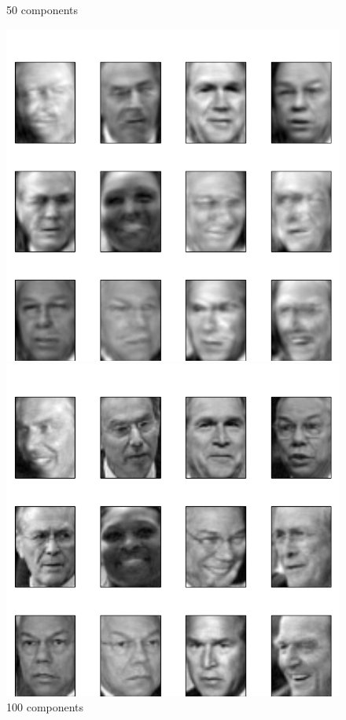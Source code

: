 \documentclass{article}
\begin{document}
\begin{enumerate}
\begin{figure}[!htb]
	  \caption{50 components}
	\endminipage\hfill
	\end{figure}
	\begin{figure}[!htb]
	  \includegraphics[width=\linewidth]{../images/reconstructed100.png}
	  \caption{100 components}
	\endminipage\hfill
	  \includegraphics[width=\linewidth]{../images/reconstructed500.png}

\end{figure}
\end{enumerate}
\end{document}
